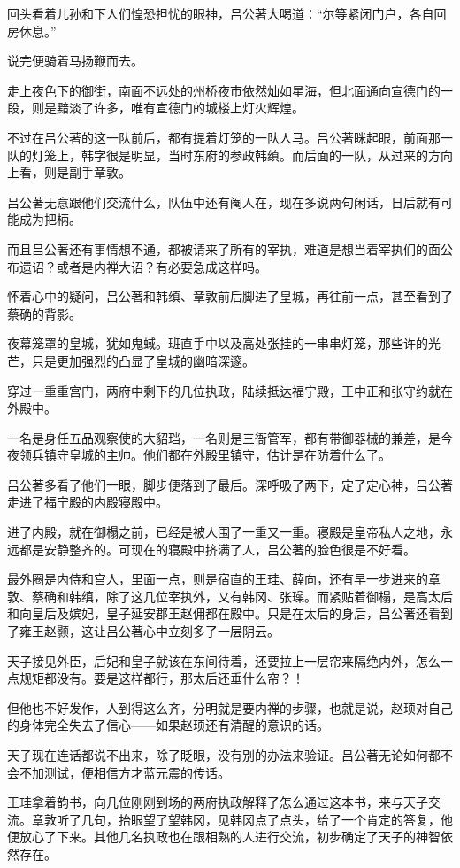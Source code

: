 回头看着儿孙和下人们惶恐担忧的眼神，吕公著大喝道：“尔等紧闭门户，各自回房休息。” 

说完便骑着马扬鞭而去。 

走上夜色下的御街，南面不远处的州桥夜市依然灿如星海，但北面通向宣德门的一段，则是黯淡了许多，唯有宣德门的城楼上灯火辉煌。 

不过在吕公著的这一队前后，都有提着灯笼的一队人马。吕公著眯起眼，前面那一队的灯笼上，韩字很是明显，当时东府的参政韩缜。而后面的一队，从过来的方向上看，则是副手章敦。 

吕公著无意跟他们交流什么，队伍中还有阉人在，现在多说两句闲话，日后就有可能成为把柄。 

而且吕公著还有事情想不通，都被请来了所有的宰执，难道是想当着宰执们的面公布遗诏？或者是内禅大诏？有必要急成这样吗。 

怀着心中的疑问，吕公著和韩缜、章敦前后脚进了皇城，再往前一点，甚至看到了蔡确的背影。 

夜幕笼罩的皇城，犹如鬼蜮。班直手中以及高处张挂的一串串灯笼，那些许的光芒，只是更加强烈的凸显了皇城的幽暗深邃。 

穿过一重重宫门，两府中剩下的几位执政，陆续抵达福宁殿，王中正和张守约就在外殿中。

一名是身任五品观察使的大貂珰，一名则是三衙管军，都有带御器械的兼差，是今夜领兵镇守皇城的主帅。他们都在外殿里镇守，估计是在防着什么了。 

吕公著多看了他们一眼，脚步便落到了最后。深呼吸了两下，定了定心神，吕公著走进了福宁殿的内殿寝殿中。 

进了内殿，就在御榻之前，已经是被人围了一重又一重。寝殿是皇帝私人之地，永远都是安静整齐的。可现在的寝殿中挤满了人，吕公著的脸色很是不好看。 

最外圈是内侍和宫人，里面一点，则是宿直的王珪、薛向，还有早一步进来的章敦、蔡确和韩缜，除了这几位宰执外，又有韩冈、张璪。而紧贴着御榻，是高太后和向皇后及嫔妃，皇子延安郡王赵佣都在殿中。只是在太后的身后，吕公著还看到了雍王赵颢，这让吕公著心中立刻多了一层阴云。 

天子接见外臣，后妃和皇子就该在东间待着，还要拉上一层帘来隔绝内外，怎么一点规矩都没有。要是这样都行，那太后还垂什么帘？！ 

但他也不好发作，人到得这么齐，分明就是要内禅的步骤，也就是说，赵顼对自己的身体完全失去了信心——如果赵顼还有清醒的意识的话。 

天子现在连话都说不出来，除了眨眼，没有别的办法来验证。吕公著无论如何都不会不加测试，便相信方才蓝元震的传话。 

王珪拿着韵书，向几位刚刚到场的两府执政解释了怎么通过这本书，来与天子交流。章敦听了几句，抬眼望了望韩冈，见韩冈点了点头，给了一个肯定的答复，他便放心了下来。其他几名执政也在跟相熟的人进行交流，初步确定了天子的神智依然存在。 

